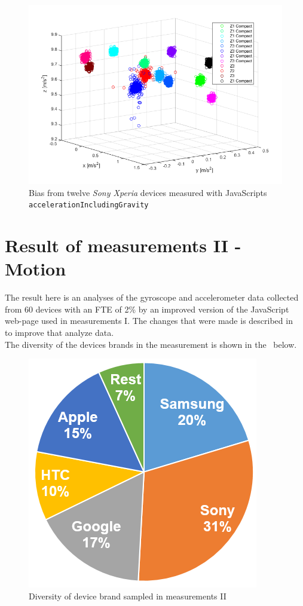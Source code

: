 \begin{figure}[ht]
	\centering
	\includegraphics[scale=0.6]{img/res-measure1-scatter-inclG}
	\caption{Bias from twelve \textit{Sony Xperia} devices measured with JavaScripts \texttt{accelerationIncludingGravity}}
	\label{fig:scatter-withGrav}
\end{figure}

\section{Result of measurements II  - Motion}\label{res:testII}
The result here is an analyses of the gyroscope and accelerometer data collected from 60 devices with an FTE of 2\% by an improved version of the JavaScript web-page used in measurements I. The changes that were made is described in~ to improve that analyze data. \\
The diversity of the devices brands in the measurement is shown in the~ below. 
\begin{figure}[H]
	\centering
	\includegraphics[scale=.4]{img/measure2-brands}
	\caption{Diversity of device brand sampled in measurements II}
	\label{fig:brandII}
\end{figure}

